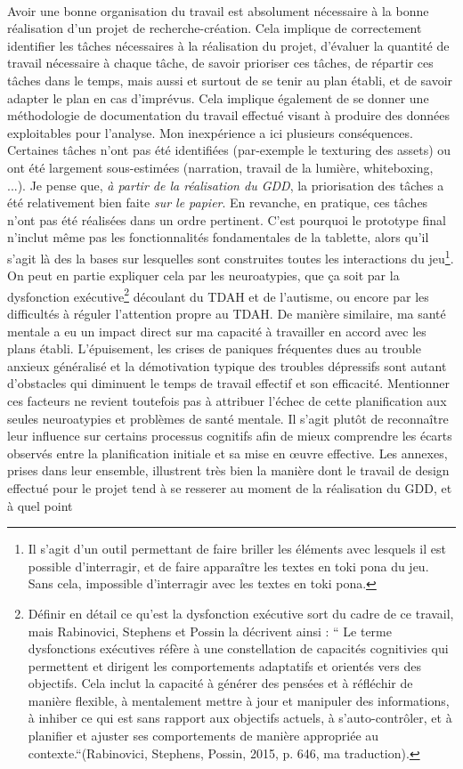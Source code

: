 \documentclass{scrartcl}
\let\emph\relax %
\begin{document}
	\emph{Organisation du travail}\\
	Avoir une bonne organisation du travail est absolument nécessaire à la bonne réalisation d'un projet de recherche-création. Cela implique de correctement identifier les tâches nécessaires à la réalisation du projet, d'évaluer la quantité de travail nécessaire à chaque tâche, de savoir prioriser ces tâches, de répartir ces tâches dans le temps, mais aussi et surtout de se tenir au plan établi, et de savoir adapter le plan en cas d'imprévus. Cela implique également de se donner une méthodologie de documentation du travail effectué visant à produire des données exploitables pour l'analyse. Mon inexpérience a ici plusieurs conséquences. Certaines tâches n'ont pas été identifiées (par-exemple le texturing des assets) ou ont été largement sous-estimées (narration, travail de la lumière, whiteboxing, ...). Je pense que, \textit{à partir de la réalisation du GDD}, la priorisation des tâches a été relativement bien faite \textit{sur le papier}. En revanche, en pratique, ces tâches n'ont pas été réalisées dans un ordre pertinent. C'est pourquoi le prototype final n'inclut même pas les fonctionnalités fondamentales de la tablette, alors qu'il s'agit là des la bases sur lesquelles sont construites toutes les interactions du jeu\footnote{Il s'agit d'un outil permettant de faire briller les éléments avec lesquels il est possible d'interragir, et de faire apparaître les textes en toki pona du jeu. Sans cela, impossible d'interragir avec les textes en toki pona.}. On peut en partie expliquer cela par les neuroatypies, que ça soit par la dysfonction exécutive\footnote{Définir en détail ce qu'est la dysfonction exécutive sort du cadre de ce travail, mais Rabinovici, Stephens et Possin la décrivent ainsi : “ Le terme dysfonctions exécutives réfère à une constellation de capacités cognitivies qui permettent et dirigent les comportements adaptatifs et orientés vers des objectifs. Cela inclut la capacité à générer des pensées et à réfléchir de manière flexible, à mentalement mettre à jour et manipuler des informations, à inhiber ce qui est sans rapport aux objectifs actuels, à s'auto-contrôler, et à planifier et ajuster ses comportements de manière appropriée au contexte.“(Rabinovici, Stephens, Possin, 2015, p. 646, ma traduction).} découlant du TDAH et de l'autisme, ou encore par les difficultés à réguler l'attention propre au TDAH. De manière similaire, ma santé mentale a eu un impact direct sur ma capacité à travailler en accord avec les plans établi. L'épuisement, les crises de paniques fréquentes dues au trouble anxieux généralisé et la démotivation typique des troubles dépressifs sont autant d'obstacles qui diminuent le temps de travail effectif et son efficacité. Mentionner ces facteurs ne revient toutefois pas à attribuer l'échec de cette planification aux seules neuroatypies et problèmes de santé mentale. Il s'agit plutôt de reconnaître leur influence sur certains processus cognitifs afin de mieux comprendre les écarts observés entre la planification initiale et sa mise en œuvre effective. Les annexes, prises dans leur ensemble, illustrent très bien la manière dont le travail de design effectué pour le projet tend à se resserer au moment de la réalisation du GDD, et à quel point 
\end{document}
